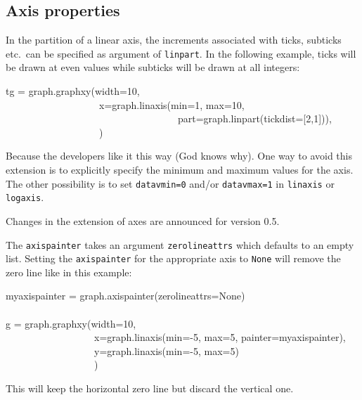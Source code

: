 \documentclass[11pt,DIV14]{scrartcl}
\begin{document}
{}
{}

{}
{
}

\subsection{Axis properties}

{}
{In the partition of a linear axis, the increments associated with ticks,
subticks etc.\ can be specified as argument of \texttt{linpart}. In the
following example, ticks will be drawn at even values while subticks will
be drawn at all integers:
\begin{progcode}
tg = graph.graphxy(width=10,\\
~~~~~~~~~~~~~~~~~~~x=graph.linaxis(min=1, max=10,\\
~~~~~~~~~~~~~~~~~~~~~~~~~~~~~~~~~~~part=graph.linpart(tickdist=[2,1])),\\
~~~~~~~~~~~~~~~~~~~)
\end{progcode}
}

{}
{Because the developers like it this way (God knows why). One way to avoid
this extension is to explicitly specify the minimum and maximum values for
the axis. The other possibility is to set \texttt{datavmin=0} and/or
\texttt{datavmax=1} in \texttt{linaxis} or \texttt{logaxis}. 

Changes in the extension of axes are announced for version 0.5.
}

{}
{The \texttt{axispainter} takes an argument \texttt{zerolineattrs} which 
defaults to an empty list. Setting the \texttt{axispainter} for the
appropriate axis to \texttt{None} will remove the zero line like in this
example:
\begin{progcode}
myaxispainter = graph.axispainter(zerolineattrs=None)\\
\\
g = graph.graphxy(width=10,\\
~~~~~~~~~~~~~~~~~~x=graph.linaxis(min=-5, max=5, painter=myaxispainter),\\
~~~~~~~~~~~~~~~~~~y=graph.linaxis(min=-5, max=5)\\
~~~~~~~~~~~~~~~~~~)
\end{progcode}
This will keep the horizontal zero line but discard the vertical one.
}
\end{document}
